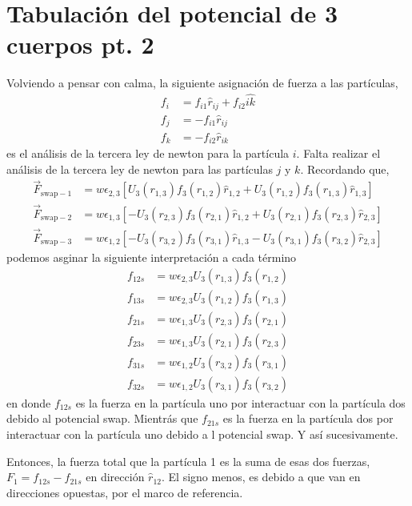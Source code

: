 \documentclass[../main.tex]{subfiles}
\begin{document}
\newpage 

\section{Tabulación del potencial de 3 cuerpos pt. 2}\label{sec:Tabulacion3Cuerpos}

Volviendo a pensar con calma, la siguiente asignación de fuerza a las partículas,
\begin{align*}
    f_{i} &= f_{i1}\hat{r}_{ij} + f_{i2}\hat{ik}\\ 
    f_{j} &= -f_{i1}\hat{r}_{ij}\\ 
    f_{k} &= -f_{i2}\hat{r}_{ik}
\end{align*}
es el análisis de la tercera ley de newton para la partícula $i$.
Falta realizar el análisis de la tercera ley de newton para las partículas $j$ y $k$.
Recordando que,
\begin{align*}
    \vec{F}_{\mathrm{swap}-1} &= w\epsilon_{2,3}\left[
        U_3(r_{1,3})f_3(r_{1,2})\hat{r}_{1,2} + U_3(r_{1,2})f_3(r_{1,3})\hat{r}_{1,3}
    \right] \\
    \vec{F}_{\mathrm{swap}-2} &= w\epsilon_{1,3}\left[
        -U_3(r_{2,3})f_3(r_{2,1})\hat{r}_{1,2} + U_3(r_{2,1})f_3(r_{2,3})\hat{r}_{2,3}
    \right] \\
    \vec{F}_{\mathrm{swap}-3} &= w\epsilon_{1,2}\left[
            -U_3(r_{3,2})f_3(r_{3,1})\hat{r}_{1,3} - U_3(r_{3,1})f_3(r_{3,2})\hat{r}_{2,3}
    \right]
\end{align*}
podemos asginar la siguiente interpretación a cada término
\begin{align*}
    f_{12s} &= w\epsilon_{2,3}U_3(r_{1,3})f_3(r_{1,2}) \\
    f_{13s} &= w\epsilon_{2,3}U_3(r_{1,2})f_3(r_{1,3}) \\
    f_{21s} &= w\epsilon_{1,3}U_3(r_{2,3})f_3(r_{2,1}) \\
    f_{23s} &= w\epsilon_{1,3}U_3(r_{2,1})f_3(r_{2,3}) \\
    f_{31s} &= w\epsilon_{1,2}U_3(r_{3,2})f_3(r_{3,1}) \\
    f_{32s} &= w\epsilon_{1,2}U_3(r_{3,1})f_3(r_{3,2})
\end{align*}
en donde \(f_{12s}\) es la fuerza en la partícula uno por interactuar con la partícula dos debido al potencial swap.
Mientrás que \(f_{21s}\) es la fuerza en la partícula dos por interactuar con la partícula uno debido a l potencial swap.
Y así sucesivamente.

Entonces, la fuerza total que la partícula 1 es la suma de esas dos fuerzas, \(F_{1} = f_{12s} - f_{21s}\) en dirección $\hat{r}_{12}$.
El signo menos, es debido a que van en direcciones opuestas, por el marco de referencia.
\end{document}
